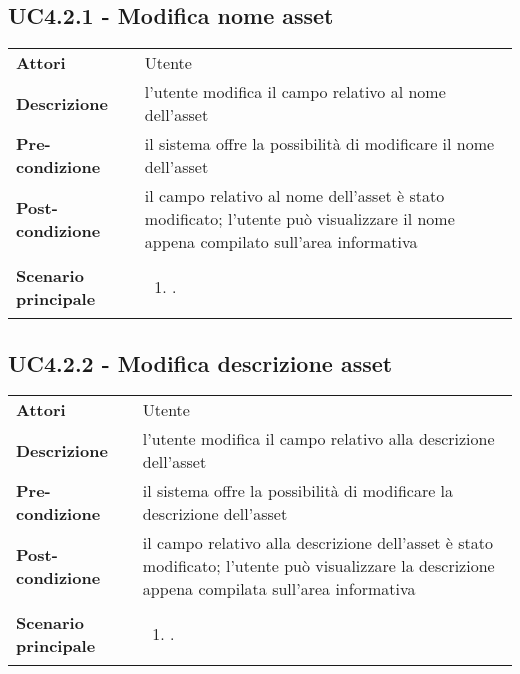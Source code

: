 \subsection{UC4.2.1 - Modifica nome asset} 
\label{sssec:UC4.2.1} 
\def\arraystretch{1.5}
\begin{tabularx}{\textwidth}{l|p{}}
	\rowcolor{I} \multicolumn{2}{c}{\color{white}\textbf{UC4.2.1 - Modifica nome asset}} \\
	\toprule
	\endhead
	\textbf{Attori} & Utente\\
	\textbf{Descrizione} & l'utente modifica il campo relativo al nome dell'asset\\
	\textbf{Pre-condizione} & il sistema offre la possibilità di modificare il nome dell'asset\\
	\textbf{Post-condizione} & il campo relativo al nome dell'asset è stato modificato; l'utente può visualizzare il nome appena compilato sull'area informativa\\
	\textbf{Scenario principale} & \vspace{-1.2em}\begin{enumerate}[leftmargin=*,noitemsep,nosep]
		\item \nameref{sssec:UC4.2.1}.
	\end{enumerate}\\
	\bottomrule
\end{tabularx}
\subsection{UC4.2.2 - Modifica descrizione asset} 
\label{sssec:UC4.2.2} 
\def\arraystretch{1.5}
\begin{tabularx}{\textwidth}{l|p{}}
	\rowcolor{I} \multicolumn{2}{c}{\color{white}\textbf{UC4.2.2 - Modifica descrizione asset}} \\
	\toprule
	\endhead
	\textbf{Attori} & Utente\\
	\textbf{Descrizione} & l'utente modifica il campo relativo alla descrizione dell'asset\\
	\textbf{Pre-condizione} & il sistema offre la possibilità di modificare la descrizione dell'asset\\
	\textbf{Post-condizione} & il campo relativo alla descrizione dell'asset è stato modificato; l'utente può visualizzare la descrizione appena compilata sull'area informativa\\
	\textbf{Scenario principale} & \vspace{-1.2em}\begin{enumerate}[leftmargin=*,noitemsep,nosep]
		\item \nameref{sssec:UC4.2.2}.
	\end{enumerate}\\
	\bottomrule
\end{tabularx}
